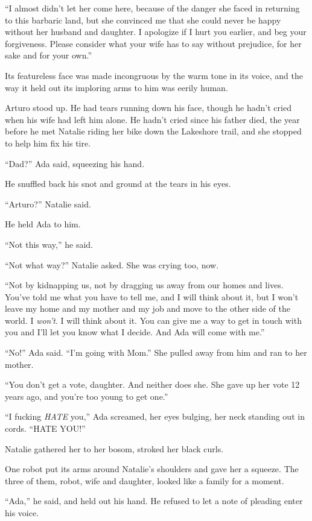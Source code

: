 “I almost didn’t let her come here, because of the danger she faced
in returning to this barbaric land, but she convinced me that she
could never be happy without her husband and daughter. I apologize
if I hurt you earlier, and beg your forgiveness. Please consider
what your wife has to say without prejudice, for her sake and for
your own.”

Its featureless face was made incongruous by the warm tone in its
voice, and the way it held out its imploring arms to him was eerily
human.

Arturo stood up. He had tears running down his face, though he
hadn’t cried when his wife had left him alone. He hadn’t cried
since his father died, the year before he met Natalie riding her
bike down the Lakeshore trail, and she stopped to help him fix his
tire.

“Dad?” Ada said, squeezing his hand.

He snuffled back his snot and ground at the tears in his eyes.

“Arturo?” Natalie said.

He held Ada to him.

“Not this way,” he said.

“Not what way?” Natalie asked. She was crying too, now.

“Not by kidnapping us, not by dragging us away from our homes and
lives. You’ve told me what you have to tell me, and I will think
about it, but I won’t leave my home and my mother and my job and
move to the other side of the world. I \emph{won’t}. I will think
about it. You can give me a way to get in touch with you and I’ll
let you know what I decide. And Ada will come with me.”

“No!” Ada said. “I’m going with Mom.” She pulled away from him and
ran to her mother.

“You don’t get a vote, daughter. And neither does she. She gave up
her vote 12 years ago, and you’re too young to get one.”

“I fucking \emph{HATE} you,” Ada screamed, her eyes bulging, her
neck standing out in cords. “HATE YOU!”

Natalie gathered her to her bosom, stroked her black curls.

One robot put its arms around Natalie’s shoulders and gave her a
squeeze. The three of them, robot, wife and daughter, looked like a
family for a moment.

“Ada,” he said, and held out his hand. He refused to let a note of
pleading enter his voice.


